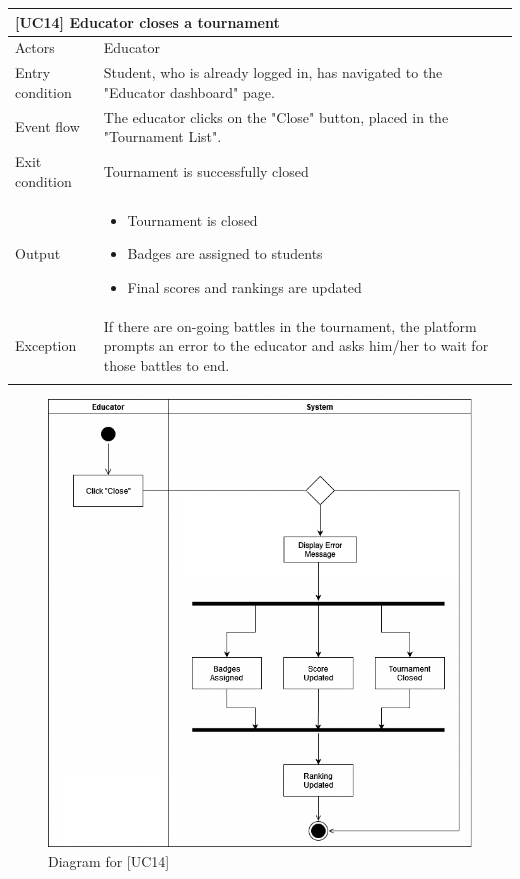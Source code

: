 \documentclass[12pt,oneside,a4paper]{article}
\begin{document}
\clearpage

\begin{table}[htbp]
\begin{tabular}{|l|p{12cm}|}
    \hline
    \multicolumn{2}{|l|}{\textbf{[UC14] Educator closes a tournament}}\\
    \hline
    Actors & Educator\\
    \hline
    Entry condition & Student, who is already logged in, has navigated to the "Educator dashboard" page.\\
    \hline
    Event flow & The educator clicks on the "Close" button, placed in the "Tournament List".\\
    \hline
    Exit condition & Tournament is successfully closed\\
    \hline
    Output & \begin{itemize}
        \item Tournament is closed
        \item Badges are assigned to students
        \item Final scores and rankings are updated
    \end{itemize}\\
    \hline
    Exception & If there are on-going battles in the tournament, the platform prompts an error to the educator and asks him/her to wait for those battles to end.\\
    \lasthline
\end{tabular}
\end{table}

\clearpage

\begin{figure}[htbp]
    \centering
    \includegraphics[width=1\linewidth]{Images/Diagrams/CloseTournament.png}
    \caption{Diagram for [UC14]}
    \label{fig:enter-label}
\end{figure}
\end{document}
